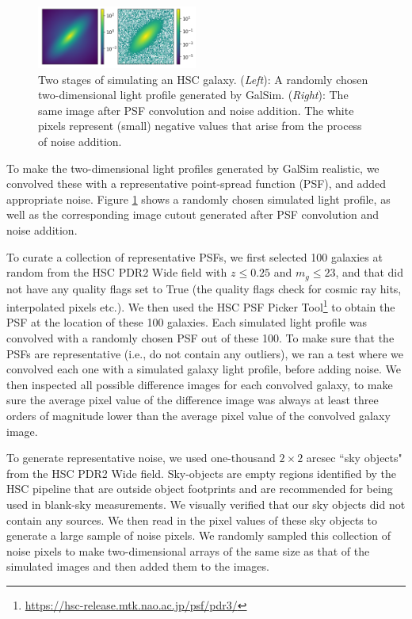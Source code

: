 \begin{figure}[htb]
    \centering
    \includegraphics[width = 0.47\textwidth]{sim_process.png}
    \caption{Two stages of simulating an HSC galaxy. (\textit{Left}): A randomly chosen two-dimensional light profile generated by GalSim. (\textit{Right}): The same image after PSF convolution and noise addition. The white pixels represent (small) negative values that arise from the process of noise addition.}
    \label{fig_c2:sim_process}
\end{figure}

To make the two-dimensional light profiles generated by GalSim realistic, we convolved these with a representative point-spread function (PSF), and added appropriate noise. Figure \ref{fig_c2:sim_process} shows a randomly chosen simulated light profile, as well as the corresponding image cutout generated after PSF convolution and noise addition. 

To curate a collection of representative PSFs, we first selected 100 galaxies at random from the HSC PDR2 Wide field \citep{hsc_pdr3} with $z \leq 0.25$ and $m_g \leq 23$, and that did not have any quality flags set to True (the quality flags check for cosmic ray hits, interpolated pixels etc.). We then used the HSC PSF Picker Tool\footnote{\href{https://hsc-release.mtk.nao.ac.jp/psf/pdr3/}{https://hsc-release.mtk.nao.ac.jp/psf/pdr3/}} to obtain the PSF at the location of these 100 galaxies. Each simulated light profile was convolved with a randomly chosen PSF out of these 100. To make sure that the PSFs are representative (i.e., do not contain any outliers), we ran a test where we convolved each one with a simulated galaxy light profile, before adding noise. 
We then inspected all possible difference images for each convolved galaxy, to make sure the average pixel value of the difference image was always at least three orders of magnitude lower than the average pixel value of the convolved galaxy image.

To generate representative noise, we used one-thousand $2\times2$ arcsec ``sky objects" from the HSC PDR2 Wide field. Sky-objects are empty regions identified by the HSC pipeline that are outside object footprints and are recommended for being used in blank-sky measurements. We visually verified that our sky objects did not contain any sources. We then read in the pixel values of these sky objects to generate a large sample of noise pixels. We randomly sampled this collection of noise pixels to make two-dimensional arrays of the same size as that of the simulated images and then added them to the images.

